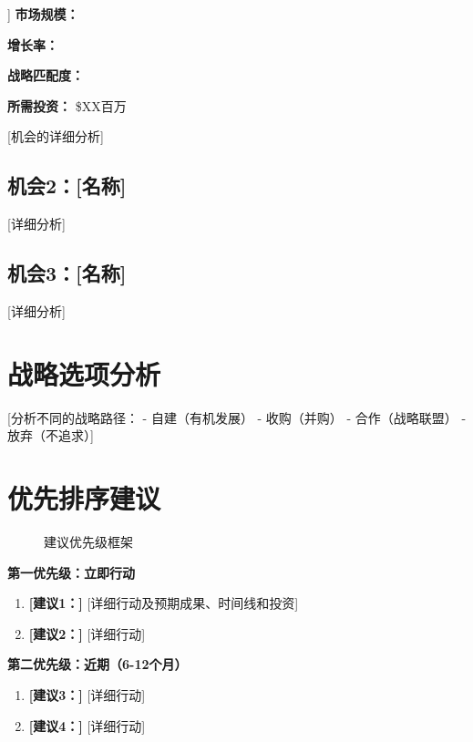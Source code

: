 \documentclass[11pt,letterpaper]{report}
\begin{document}
{\begin{opportunitybox}[机会：[名称]]
\textbf{市场规模：} 

\textbf{增长率：} 

\textbf{战略匹配度：} 

\textbf{所需投资：} \$XX百万
\end{opportunitybox}

[机会的详细分析]

\subsection{机会2：[名称]}
[详细分析]

\subsection{机会3：[名称]}
[详细分析]

\section{战略选项分析}

[分析不同的战略路径：
- 自建（有机发展）
- 收购（并购）
- 合作（战略联盟）
- 放弃（不追求）]

\section{优先排序建议}


\begin{figure}[htbp]
\centering
\caption{建议优先级框架}
\label{fig:recommendations}
\end{figure}

\begin{recommendationbox}[战略建议]
\textbf{第一优先级：立即行动}
\begin{enumerate}
    \item \textbf{[建议1：]} [详细行动及预期成果、时间线和投资]
    \item \textbf{[建议2：]} [详细行动]
\end{enumerate}

\textbf{第二优先级：近期（6-12个月）}
\begin{enumerate}[start=3]
    \item \textbf{[建议3：]} [详细行动]
    \item \textbf{[建议4：]} [详细行动]
\end{enumerate}


\end{recommendationbox}}
\end{document}
